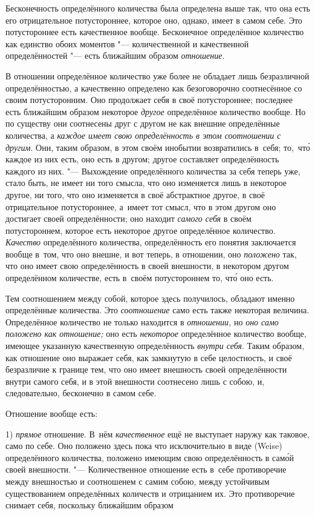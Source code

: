 Бесконечность определённого количества была определена выше так, что она
есть его отрицательное потустороннее, которое оно, однако, имеет в самом
себе. Это потустороннее есть качественное вообще. Бесконечное определённое
количество как единство обоих моментов "--- количественной и качественной
определённостей "--- есть ближайшим образом {\em отношение}.

В отношении определённое количество уже более не обладает лишь безразличной
определённостью, а качественно определено как безоговорочно соотнесённое со
своим потусторонним. Оно продолжает себя в своё потустороннее; последнее есть
ближайшим образом некоторое {\em другое} определённое количество вообще. Но по
существу они соотнесены друг с другом не как внешние определённые количества, а
{\em каждое имеет свою определённость в этом соотношении с другим}. Они, таким
образом, в этом своём инобытии возвратились в~себя; то,~чт\'{о} каждое из них
есть, оно есть в другом; другое составляет определённость каждого из них. "---
Выхождение определённого количества за себя теперь уже, стало быть, не имеет ни
того смысла, что оно изменяется лишь в некоторое другое, ни того, что оно
изменяется в своё абстрактное другое, в своё отрицательное потустороннее,
а~имеет тот смысл, что в этом другом оно достигает своей определённости; оно
находит {\em самого себя} в своём потустороннем, которое есть некоторое другое
определённое количество. {\em Качество} определённого количества,
определённость его понятия заключается вообще в~том, что оно внешне, и вот
теперь, в отношении, оно {\em положено} так, что оно имеет свою определённость
в своей внешности, в некотором другом определённом количестве, есть в~своём
потустороннем то, чт\'{о} оно есть.

Тем соотношением между собой, которое здесь получилось, обладают именно
определённые количества. Это {\em соотношение} само есть также некоторая
величина. Определённое количество не только находится в {\em отношении,} но
{\em оно само положено как отношение;} оно есть {\em некоторое} определённое
количество вообще, имеющее указанную качественную определённость
{\em внутри себя}. Таким образом, как отношение оно выражает себя, как
замкнутую в себе целостность, и своё безразличие к границе тем, что оно имеет
внешность своей определённости внутри самого себя, и в этой внешности
соотнесено лишь с собою, и, следовательно, бесконечно в самом себе.

Отношение вообще есть:

1) {\em прямое} отношение. В~нём {\em качественное} ещё не выступает наружу как
таковое, само по себе. Оно положено здесь пока что
исключительно в виде (Weise) определённого количества, положено имеющим свою
определённость в сам\'{о}й своей внешности. "--- Количественное отношение есть
в~себе противоречие между внешностью и соотношенем с самим собою, между устойчивым существованием
определённых количеств и отрицанием их. Это противоречие снимает себя, поскольку
ближайшим образом

